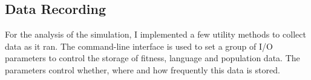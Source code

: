\documentclass[12pt,a4paper]{report}
\begin{document}



\subsection{Data Recording}

For the analysis of the simulation, I implemented a few utility methods to collect data as it ran. The command-line interface is used to set a group of I/O parameters to control the storage of fitness, language and population data. The parameters control whether, where and how frequently this data is stored.%
\end{document}

